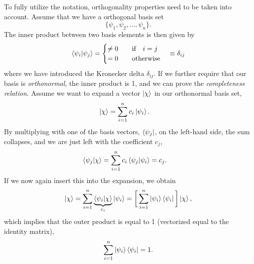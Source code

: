 To fully utilize the notation, orthogonality properties need to be taken into account. Assume that we have a orthogonal basis set 
\begin{equation}
\{\psi_1,\psi_2,\hdots,\psi_n\}.
\end{equation}
The inner product between two basis elements is then given by
\begin{equation}
\braket{\psi_i}{\psi_j}=
\begin{cases}
\neq 0\quad&\text{if}\quad i=j\\
=0\quad&\text{otherwise}
\end{cases}
\quad\equiv\delta_{ij}
\end{equation}
where we have introduced the Kronecker delta $\delta_{ij}$. If we further require that our basis is \textit{orthonormal}, the inner product is 1, and we can prove the \textit{completeness relation}. Assume we want to expand a vector $\ket{\chi}$ in our orthonormal basis set,
\begin{align}
\ket{\chi}&=\sum_{i=1}^nc_i\ket{\psi_i}.
\end{align}
By multiplying with one of the basis vectors, $\bra{\psi_j}$, on the left-hand side, the sum collapses, and we are just left with the coefficient $c_j$,
\begin{align}
\braket{\psi_j}{\chi} &= \sum_{i=1}^nc_i\braket{\psi_j}{\psi_i}=c_j.
\end{align}
If we now again insert this into the expansion, we obtain
\begin{equation}
\ket{\chi}=\sum_{i=1}^n\underbrace{\braket{\psi_i}{\chi}}_{c_i}\ket{\psi_i}=\bigg[\sum_{i=1}^n\ket{\psi_i}\bra{\psi_i}\bigg]\ket{\chi},
\end{equation}
which implies that the outer product is equal to 1 (vectorized equal to the identity matrix),
\begin{equation}
\sum_{i=1}^n\ket{\psi_i}\bra{\psi_i}=1.
\end{equation}

